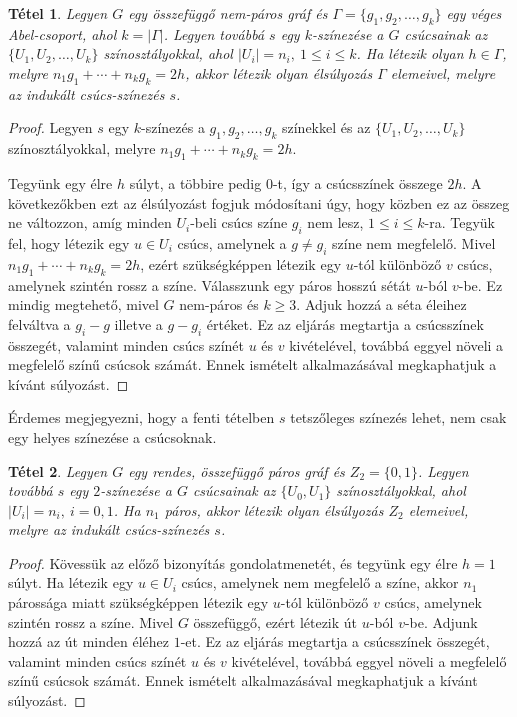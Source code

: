\documentclass[12pt, a4paper]{report}
\newtheorem{tét}{Tétel}[section]
\theoremstyle{remark}
\theoremstyle{definition}
\begin{document}
\begin{tét}
Legyen $G$ egy összefüggő nem-páros gráf és $\Gamma = \lbrace g_1, g_2, \ldots, g_k \rbrace$ egy véges Abel-csoport, ahol $k = |\Gamma|$. Legyen továbbá $s$ egy $k$-színezése a $G$ csúcsainak az $\lbrace U_1, U_2, \ldots, U_k \rbrace$  színosztályokkal, ahol $|U_i| = n_i,\ 1 \leq i \leq k$. Ha létezik olyan $h \in \Gamma$, melyre $n_1 g_1 + \cdots + n_k g_k = 2h$, akkor létezik olyan élsúlyozás $\Gamma$ elemeivel, melyre az indukált csúcs-színezés $s$.
\end{tét}

\begin{proof}
Legyen $s$ egy $k$-színezés a $g_1, g_2, \ldots, g_k$ színekkel és az $\lbrace U_1, U_2, \ldots, U_k \rbrace$ színosztályokkal, melyre $n_1 g_1 + \cdots + n_k g_k = 2h$.

Tegyünk egy élre $h$ súlyt, a többire pedig $0$-t, így a csúcsszínek összege $2h$. A következőkben ezt az élsúlyozást fogjuk módosítani úgy, hogy közben ez az összeg ne változzon, amíg minden $U_i$-beli csúcs színe $g_i$ nem lesz, $1 \leq i \leq k$-ra. Tegyük fel, hogy létezik egy $u \in U_i$ csúcs, amelynek a $g \neq g_i$ színe nem megfelelő. Mivel $n_1 g_1 + \cdots + n_k g_k = 2h$, ezért szükségképpen létezik egy $u$-tól különböző $v$ csúcs, amelynek szintén rossz a színe. Válasszunk egy páros hosszú sétát $u$-ból $v$-be. Ez mindig megtehető, mivel $G$ nem-páros és $k \geq 3$. Adjuk hozzá a séta éleihez felváltva a $g_i - g$ illetve a $g - g_i$ értéket. Ez az eljárás megtartja a csúcsszínek összegét, valamint minden csúcs színét $u$ és $v$ kivételével, továbbá eggyel növeli a megfelelő színű csúcsok számát. Ennek ismételt alkalmazásával megkaphatjuk a kívánt súlyozást.
\end{proof}

Érdemes megjegyezni, hogy a fenti tételben $s$ tetszőleges színezés lehet, nem csak egy helyes színezése a csúcsoknak.

\begin{tét}
Legyen $G$ egy rendes, összefüggő páros gráf és $Z_2 = \lbrace 0, 1 \rbrace$. Legyen továbbá $s$ egy $2$-színezése a $G$ csúcsainak az $\lbrace U_0, U_1 \rbrace$ színosztályokkal, ahol $|U_i| = n_i,\ i = 0, 1$. Ha $n_1$ páros, akkor létezik olyan élsúlyozás $Z_2$ elemeivel, melyre az indukált csúcs-színezés $s$.
\end{tét}

\begin{proof}
Kövessük az előző bizonyítás gondolatmenetét, és tegyünk egy élre $h = 1$ súlyt. Ha létezik egy $u \in U_i$ csúcs, amelynek nem megfelelő a színe, akkor $n_1$ párossága miatt szükségképpen létezik egy $u$-tól különböző $v$ csúcs, amelynek szintén rossz a színe. Mivel $G$ összefüggő, ezért létezik út $u$-ból $v$-be. Adjunk hozzá az út minden éléhez $1$-et. Ez az eljárás megtartja a csúcsszínek összegét, valamint minden csúcs színét $u$ és $v$ kivételével, továbbá eggyel növeli a megfelelő színű csúcsok számát. Ennek ismételt alkalmazásával megkaphatjuk a kívánt súlyozást.
\end{proof}
\end{document}
